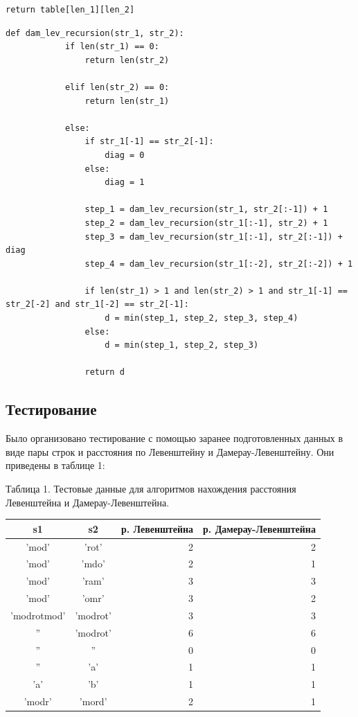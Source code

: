 \documentclass[a4paper, 14pt]{article}
\begin{document}
\begin{center}
\begin{flushleft}
\begin{lstlisting}[label=some-code,caption=Функция нахождения расстояния Дамерау-Левенштейна итеративно]
			return table[len_1][len_2]
        \end{lstlisting}
        \begin{lstlisting}[label=some-code,caption=Функция нахождения расстояния Дамерау-Левенштейна рекурсивно]
	def dam_lev_recursion(str_1, str_2):
			if len(str_1) == 0:
				return len(str_2)

			elif len(str_2) == 0:
				return len(str_1)

			else:
				if str_1[-1] == str_2[-1]:
					diag = 0
				else:
					diag = 1

				step_1 = dam_lev_recursion(str_1, str_2[:-1]) + 1
				step_2 = dam_lev_recursion(str_1[:-1], str_2) + 1
				step_3 = dam_lev_recursion(str_1[:-1], str_2[:-1]) + diag
				step_4 = dam_lev_recursion(str_1[:-2], str_2[:-2]) + 1

				if len(str_1) > 1 and len(str_2) > 1 and str_1[-1] == str_2[-2] and str_1[-2] == str_2[-1]:
					d = min(step_1, step_2, step_3, step_4)
				else:
					d = min(step_1, step_2, step_3)

				return d
        \end{lstlisting}
		\end{flushleft}
        
		\newpage
		
        \subsection{Тестирование}
        \begin{flushleft}
        \parindent=1cm
        Было организовано тестирование с помощью заранее подготовленных данных в виде пары строк и расстояния по Левенштейну и Дамерау-Левенштейну. Они приведены в таблице 1:\\
        	\begin{center}
  	Таблица 1. Тестовые данные для алгоритмов нахождения расстояния Левенштейна и Дамерау-Левенштейна.\\
	\end{center}
        
        \begin{tabular}{ | c | c | r | r | }
        \hline
s1 & s2 & р. Левенштейна & р. Дамерау-Левенштейна \\ \hline
'mod' & 'rot' & 2 & 2\\
'mod' & 'mdo' & 2 & 1\\
'mod' & 'ram' & 3 & 3\\
'mod' & 'omr' & 3 & 2\\
'modrotmod' & 'modrot' & 3 & 3\\
'' & 'modrot' & 6 & 6\\
'' & '' & 0 & 0\\
'' & 'a' & 1 & 1\\
'a' & 'b' & 1 & 1\\
'modr' & 'mord' & 2 & 1\\
\hline
        \end{tabular}
	

\end{flushleft}
\end{center}
\end{document}
